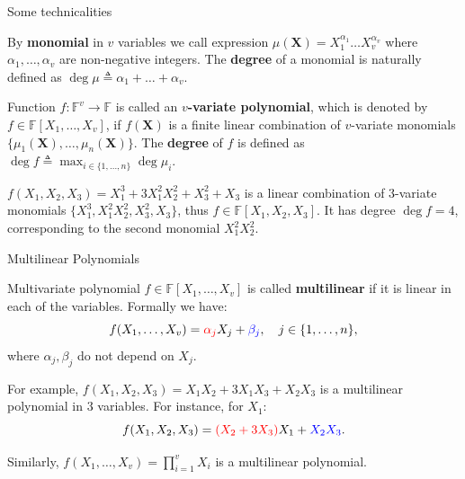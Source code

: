 \documentclass{zkdl-presentation-template}
\begin{document}
    \begin{frame}{Some technicalities}
        \begin{definition}[Monomial]
            By \textbf{monomial} in $v$ variables we call expression
            $\mu(\mathbf{X})=X_1^{\alpha_1}\dots X_v^{\alpha_v}$ where
            $\alpha_1,\dots,\alpha_v$ are non-negative integers. The
            \textbf{degree} of a monomial is naturally defined as $\deg \mu \triangleq
            \alpha_1+\dots+\alpha_v$.
        \end{definition}

        \begin{definition}
            Function $f: \mathbb{F}^v \to \mathbb{F}$ is called an
            \textbf{$v$-variate polynomial}, which is denoted by $f \in
            \mathbb{F}[X_1,\dots,X_v]$, if $f(\mathbf{X})$ is a finite linear
            combination of $v$-variate monomials
            $\{\mu_1(\mathbf{X}),\dots,\mu_n(\mathbf{X})\}$. The \textbf{degree}
            of $f$ is defined as $\deg f \triangleq \max_{i \in \{1,\dots,n\}}
            \deg \mu_i$. 
        \end{definition}

        \begin{example}
            $f(X_1,X_2,X_3)=X_1^3 + 3X_1^2X_2^2 + X_3^2 + X_3$ is a linear
            combination of 3-variate monomials $\{X_1^3, X_1^2X_2^2, X_3^2,
            X_3\}$, thus $f \in \mathbb{F}[X_1,X_2,X_3]$. It has degree $\deg
            f=4$, corresponding to the second monomial $X_1^2X_2^2$.
        \end{example}
    \end{frame}

    \begin{frame}{Multilinear Polynomials}
        \begin{definition}
            Multivariate polynomial $f \in \mathbb{F}[X_1,\dots,X_v]$ is called
            \textbf{multilinear} if it is linear in each of the variables.
            Formally we have:
            \begin{equation*}
                f(X_1,\dots,X_v) = \textcolor{red}{\alpha_j} X_j + \textcolor{blue}{\beta_j}, \quad j \in \{1,\dots,n\},
            \end{equation*}
            where $\alpha_j,\beta_j$ do not depend on $X_j$.
        \end{definition}

        \begin{example}
            For example, $f(X_1,X_2,X_3) = X_1X_2 + 3X_1X_3 + X_2X_3$ is a multilinear 
            polynomial in $3$ variables. For instance, for $X_1$:
            \begin{equation*}
                f(X_1,X_2,X_3) = \textcolor{red}{(X_2+3X_3)}X_1 + \textcolor{blue}{X_2X_3}.
            \end{equation*}

            Similarly, $f(X_1,\dots,X_v)=\prod_{i=1}^v X_i$ is a multilinear
            polynomial.
        \end{example}
    \end{frame}
\end{document}
